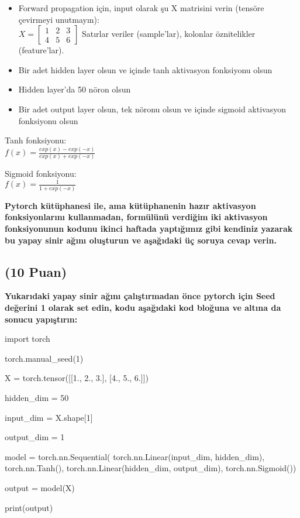 \documentclass[11pt]{article}
\begin{document}
\begin{itemize}
    \item Forward propagation için, input olarak şu X matrisini verin (tensöre çevirmeyi unutmayın):\\
    $X = \begin{bmatrix}
        1 & 2 & 3\\
        4 & 5 & 6
        \end{bmatrix}$
    Satırlar veriler (sample'lar), kolonlar öznitelikler (feature'lar).
    \item Bir adet hidden layer olsun ve içinde tanh aktivasyon fonksiyonu olsun
    \item Hidden layer'da 50 nöron olsun
    \item Bir adet output layer olsun, tek nöronu olsun ve içinde sigmoid aktivasyon fonksiyonu olsun
\end{itemize}

Tanh fonksiyonu:\\
$f(x) = \frac{exp(x) - exp(-x)}{exp(x) + exp(-x)}$
\vspace{.2in}

Sigmoid fonksiyonu:\\
$f(x) = \frac{1}{1 + exp(-x)}$

\vspace{.2in}
 \textbf{Pytorch kütüphanesi ile, ama kütüphanenin hazır aktivasyon fonksiyonlarını kullanmadan, formülünü verdiğim iki aktivasyon fonksiyonunun kodunu ikinci haftada yaptığımız gibi kendiniz yazarak bu yapay sinir ağını oluşturun ve aşağıdaki üç soruya cevap verin.}
 
\subsection{(10 Puan)} \textbf{Yukarıdaki yapay sinir ağını çalıştırmadan önce pytorch için Seed değerini 1 olarak set edin, kodu aşağıdaki kod bloğuna ve altına da sonucu yapıştırın:}

\begin{python}
import torch

torch.manual_seed(1)

X = torch.tensor([[1., 2., 3.], [4., 5., 6.]])

hidden_dim = 50

input_dim = X.shape[1]

output_dim = 1

model = torch.nn.Sequential(
          torch.nn.Linear(input_dim, hidden_dim),
          torch.nn.Tanh(),
          torch.nn.Linear(hidden_dim, output_dim),
          torch.nn.Sigmoid())

output = model(X)

print(output)

\end{python}
\end{document}
